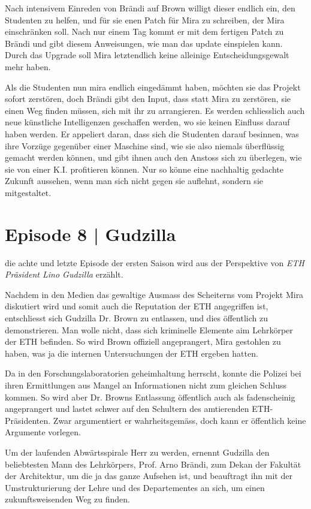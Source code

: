 \documentclass[11pt,a4paper,ngerman]{scrreprt}
\begin{document}
Nach intensivem Einreden von Brändi auf Brown willigt dieser endlich ein, den
Studenten zu helfen, und für sie enen Patch für Mira zu schreiben, der Mira
einschränken soll. Nach nur einem Tag kommt er mit dem fertigen Patch zu
Brändi und gibt diesem Anweisungen, wie man das update einspielen kann. Durch
das Upgrade soll Mira letztendlich keine alleinige Entscheidungsgewalt mehr
haben.

Als die Studenten nun mira endlich eingedämmt haben, möchten sie das Projekt
sofort zerstören, doch Brändi gibt den Input, dass statt Mira zu zerstören,
sie einen Weg finden müssen, sich mit ihr zu arrangieren. Es werden
schliesslich auch neue künstliche Intelligenzen geschaffen werden, wo sie
keinen Einfluss darauf haben werden. Er appeliert daran, dass sich die
Studenten darauf besinnen, was ihre Vorzüge gegenüber einer Maschine sind,
wie sie also niemals überflüssig gemacht werden können, und gibt ihnen auch
den Anstoss sich zu überlegen, wie sie von einer K.I. profitieren können. Nur
so könne eine nachhaltig gedachte Zukunft aussehen, wenn man sich nicht gegen
sie auflehnt, sondern sie mitgestaltet.

\section*{Episode 8 | Gudzilla}

die achte und letzte Episode der ersten Saison wird aus der Perspektive von
\emph{ETH Präsident Lino Gudzilla} erzählt.

Nachdem in den Medien das gewaltige Ausmass des Scheiterns vom Projekt Mira
diskutiert wird und somit auch die Reputation der ETH angegriffen ist,
entschliesst sich Gudzilla Dr. Brown zu entlassen, und dies öffentlich zu
demonstrieren. Man wolle nicht, dass sich kriminelle Elemente aim Lehrkörper
der ETH befinden. So wird Brown offiziell angeprangert, Mira gestohlen zu
haben, was ja die internen Untersuchungen der ETH ergeben hatten.

Da in den Forschungslaboratorien geheimhaltung herrscht, konnte die Polizei
bei ihren Ermittlungen aus Mangel an Informationen nicht zum gleichen Schluss
kommen. So wird aber Dr. Browns Entlassung öffentlich auch als fadenscheinig
angeprangert und lastet schwer auf den Schultern des amtierenden
ETH-Präsidenten. Zwar argumentiert er wahrheitsgemäss, doch kann er
öffentlich keine Argumente vorlegen.

Um der laufenden Abwärtsspirale Herr zu werden, ernennt Gudzilla den
beliebtesten Mann des Lehrkörpers, Prof. Arno Brändi, zum Dekan der Fakultät
der Architektur, um die ja das ganze Aufsehen ist, und beauftragt ihn mit der
Umstrukturierung der Lehre und des Departementes an sich, um einen
zukunftsweisenden Weg zu finden.
\end{document}
